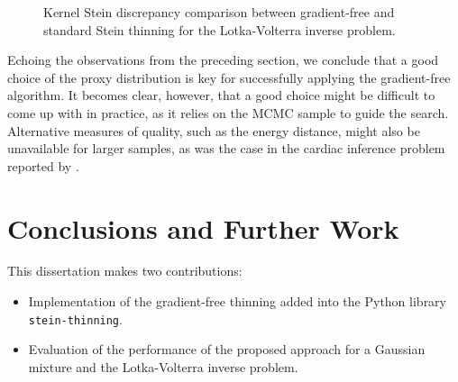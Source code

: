 \documentclass[11pt,a4paper]{report}
\begin{document}
\begin{figure}[h]
\centering
{}
\caption{Kernel Stein discrepancy comparison between gradient-free and standard Stein thinning for the Lotka-Volterra inverse problem.
\label{fig:lotka-volterra:gf-thinning:ksd}}
\end{figure}

Echoing the observations from the preceding section, we conclude that a good choice of the proxy distribution is key for successfully applying the gradient-free algorithm. It becomes clear, however, that a good choice might be difficult to come up with in practice, as it relies on the MCMC sample to guide the search. Alternative measures of quality, such as the energy distance, might also be unavailable for larger samples, as was the case in the cardiac inference problem reported by \cite{riabizOptimalThinningMCMC2022}.

\chapter{Conclusions and Further Work}
\label{ch:conclusions}

This dissertation makes two contributions:
\begin{itemize}
\item Implementation of the gradient-free thinning added into the Python library \texttt{stein-thinning}.
\item Evaluation of the performance of the proposed approach for a Gaussian mixture and the Lotka-Volterra inverse problem.
\end{itemize}
\end{document}
